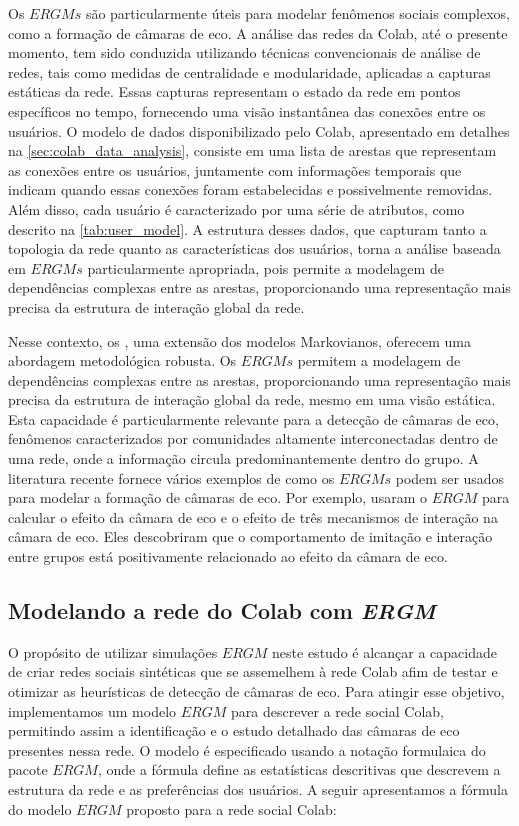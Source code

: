 Os $ERGMs$ são particularmente úteis para modelar fenômenos sociais complexos, como a formação de câmaras de eco. A análise das redes da Colab, até o presente momento, tem sido conduzida utilizando técnicas convencionais de análise de redes, tais como medidas de centralidade e modularidade, aplicadas a capturas estáticas da rede. Essas capturas representam o estado da rede em pontos específicos no tempo, fornecendo uma visão instantânea das conexões entre os usuários. O modelo de dados disponibilizado pelo Colab, apresentado em detalhes na \autoref{sec:colab_data_analysis}, consiste em uma lista de arestas que representam as conexões entre os usuários, juntamente com informações temporais que indicam quando essas conexões foram estabelecidas e possivelmente removidas. Além disso, cada usuário é caracterizado por uma série de atributos, como descrito na \autoref{tab:user_model}. A estrutura desses dados, que capturam tanto a topologia da rede quanto as características dos usuários, torna a análise baseada em $ERGMs$ particularmente apropriada, pois permite a modelagem de dependências complexas entre as arestas, proporcionando uma representação mais precisa da estrutura de interação global da rede.

Nesse contexto, os , uma extensão dos modelos Markovianos, oferecem uma abordagem metodológica robusta. Os $ERGMs$ permitem a modelagem de dependências complexas entre as arestas, proporcionando uma representação mais precisa da estrutura de interação global da rede, mesmo em uma visão estática. Esta capacidade é particularmente relevante para a detecção de câmaras de eco, fenômenos caracterizados por comunidades altamente interconectadas dentro de uma rede, onde a informação circula predominantemente dentro do grupo. A literatura recente fornece vários exemplos de como os $ERGMs$ podem ser usados para modelar a formação de câmaras de eco. Por exemplo,  usaram o $ERGM$ para calcular o efeito da câmara de eco e o efeito de três mecanismos de interação na câmara de eco. Eles descobriram que o comportamento de imitação e interação entre grupos está positivamente relacionado ao efeito da câmara de eco.

\subsection{Modelando a rede do Colab com \textit{ERGM}}

O propósito de utilizar simulações $ERGM$ neste estudo é alcançar a capacidade de criar redes sociais sintéticas que se assemelhem à rede Colab afim de testar e otimizar as heurísticas de detecção de câmaras de eco. Para atingir esse objetivo, implementamos um modelo $ERGM$ para descrever a rede social Colab, permitindo assim a identificação e o estudo detalhado das câmaras de eco presentes nessa rede.  O modelo é especificado usando a notação formulaica do pacote $ERGM$, onde a fórmula define as estatísticas descritivas que descrevem a estrutura da rede e as preferências dos usuários. A seguir apresentamos a fórmula do modelo $ERGM$ proposto para a rede social Colab:

